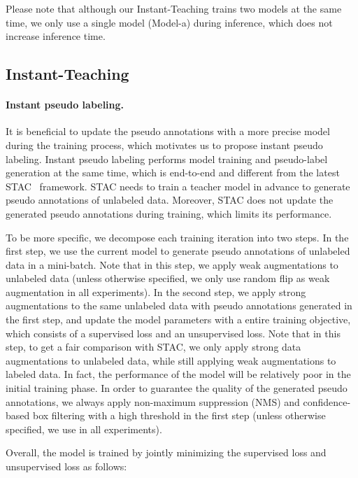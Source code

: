\documentclass[final]{cvpr}
\begin{document}
Please note that although our Instant-Teaching trains two models at the same time, we only use a single model (Model-a) during inference, which does not increase inference time.



\subsection{Instant-Teaching}
\label{method:instant-teaching}

\paragraph{Instant pseudo labeling.} It is beneficial to update the pseudo annotations with a more precise model during the training process, which motivates us to propose instant pseudo labeling. 
Instant pseudo labeling performs model training and pseudo-label generation at the same time, which is end-to-end and different from the latest STAC~\cite{sohn2020simple} framework. STAC needs to train a teacher model in advance to generate pseudo annotations of unlabeled data. Moreover, STAC does not update the generated pseudo annotations during training, which limits its performance.

To be more specific, we decompose each training iteration into two steps. In the first step, we use the current model to generate pseudo annotations of unlabeled data in a mini-batch. Note that in this step, we apply weak augmentations  to unlabeled data (unless otherwise specified, we only use random flip as weak augmentation in all experiments). In the second step, we apply strong augmentations  to the same unlabeled data with pseudo annotations generated in the first step, and update the model parameters with a entire training objective, which consists of a supervised loss and an unsupervised loss. Note that in this step, to get a fair comparison with STAC, we only apply strong data augmentations to unlabeled data, while still applying weak augmentations to labeled data.
In fact, the performance of the model will be relatively poor in the initial training phase. In order to guarantee the quality of the generated pseudo annotations, we always apply non-maximum suppression (NMS) and confidence-based box filtering with a high threshold  in the first step (unless otherwise specified, we use  in all experiments).

Overall, the model is trained by jointly minimizing the supervised loss and unsupervised loss as follows:
\end{document}
